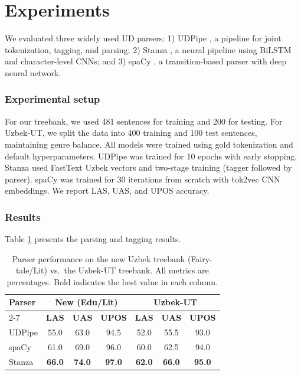 \documentclass[10pt,conference,a4paper]{IEEEtran_EDM}
\begin{document}
\section{Experiments}
We evaluated three widely used UD parsers: 1) UDPipe \cite{straka-etal-2016-udpipe}, a pipeline for joint tokenization, tagging, and parsing; 2) Stanza \cite{qi-etal-2020-stanza}, a neural pipeline using BiLSTM and character-level CNNs; and 3) spaCy \cite{Honnibal2017-lw}, a transition-based parser with deep neural network.

\subsubsection{Experimental setup} For our treebank, we used 481 sentences for training and 200 for testing. For Uzbek-UT, we split the data into 400 training and 100 test sentences, maintaining genre balance. All models were trained using gold tokenization and default hyperparameters. UDPipe was trained for 10 epochs with early stopping. Stanza used FastText Uzbek vectors and two-stage training (tagger followed by parser). spaCy was trained for 30 iterations from scratch with tok2vec CNN embeddings. We report LAS, UAS, and UPOS accuracy.

\subsubsection{Results} Table \ref{tab:parser_performance} presents the parsing and tagging results.
\begin{table}[ht]
\caption{Parser performance on the new Uzbek treebank (Fairy-tale/Lit) vs.\ the Uzbek-UT treebank. All metrics are percentages. Bold indicates the best value in each column.}
\begin{center}
\begin{tabular}{lccc|ccc}
\hline
\textbf{Parser} & \multicolumn{3}{c|}{\textbf{New (Edu/Lit)}} & \multicolumn{3}{c}{\textbf{Uzbek-UT}} \\
\cline{2-7}
& \textbf{LAS} & \textbf{UAS} & \textbf{UPOS} & \textbf{LAS} & \textbf{UAS} & \textbf{UPOS} \\
\hline
UDPipe & 55.0 & 63.0 & 94.5 & 52.0 & 55.5 & 93.0 \\
spaCy  & 61.0 & 69.0 & 96.0 & 60.0 & 62.5 & 94.0 \\
Stanza & \textbf{66.0} & \textbf{74.0} & \textbf{97.0} & \textbf{62.0} & \textbf{66.0} & \textbf{95.0} \\
\hline
\end{tabular}
\label{tab:parser_performance}
\end{center}
\end{table}
\end{document}
